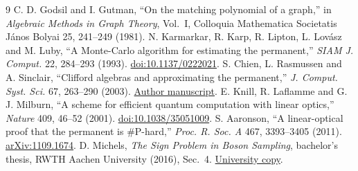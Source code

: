\documentclass[11pt]{article}
\begin{document}
\begin{thebibliography}{9}
 C. D. Godsil and I. Gutman, ``On the matching polynomial of a graph,'' in \emph{Algebraic Methods in Graph Theory}, Vol.~I, Colloquia Mathematica Societatis J\'anos Bolyai 25, 241--249 (1981).
 N. Karmarkar, R. Karp, R. Lipton, L. Lov\'asz and M. Luby, ``A Monte-Carlo algorithm for estimating the permanent,'' \emph{SIAM J. Comput.} 22, 284--293 (1993). \href{https://doi.org/10.1137/0222021}{doi:10.1137/0222021}.
 S. Chien, L. Rasmussen and A. Sinclair, ``Clifford algebras and approximating the permanent,'' \emph{J. Comput. Syst. Sci.} 67, 263--290 (2003). \href{https://people.eecs.berkeley.edu/~sinclair/clifford.pdf}{Author manuscript}.
 E. Knill, R. Laflamme and G. J. Milburn, ``A scheme for efficient quantum computation with linear optics,'' \emph{Nature} 409, 46--52 (2001). \href{https://doi.org/10.1038/35051009}{doi:10.1038/35051009}.
 S. Aaronson, ``A linear-optical proof that the permanent is \#P-hard,'' \emph{Proc. R. Soc. A} 467, 3393--3405 (2011). \href{https://arxiv.org/abs/1109.1674}{arXiv:1109.1674}.
 D. Michels, \emph{The Sign Problem in Boson Sampling}, bachelor's thesis, RWTH Aachen University (2016), Sec.~4. \href{https://www.rwth-aachen.de/global/show_document.asp?id=aaaaaaaaaarxnkh}{University copy}.
\end{thebibliography}
\end{document}
